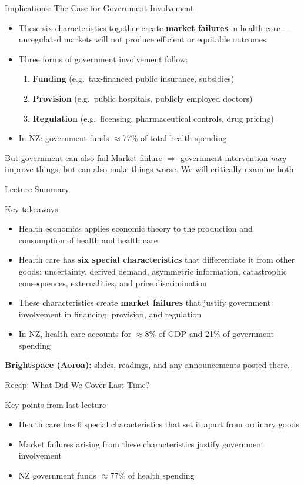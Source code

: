 \documentclass[aspectratio=169, 12pt]{beamer}
\newcommand{\recapslide}[1]{%
  \begin{frame}{Recap: What Did We Cover Last Time?}
    \begin{block}{Key points from last lecture}
      \begin{itemize}#1\end{itemize}
    \end{block}
  \end{frame}}
\newcommand{\summaryside}[1]{%
  \begin{frame}{Lecture Summary}
    \begin{exampleblock}{Key takeaways}
      \begin{itemize}#1\end{itemize}
    \end{exampleblock}
    \vspace{0.5em}
    {\footnotesize\textcolor{OtagoGold}{\textbf{Brightspace (Aoroa):}} slides, readings, and any announcements posted there.}
  \end{frame}}
\begin{document}
\begin{frame}{Implications: The Case for Government Involvement}
  \begin{itemize}
    \item These six characteristics together create \textbf{market failures} in health care ---
          unregulated markets will not produce efficient or equitable outcomes
    \item Three forms of government involvement follow:
    \begin{enumerate}
      \item \textbf{Funding} (e.g.\ tax-financed public insurance, subsidies)
      \item \textbf{Provision} (e.g.\ public hospitals, publicly employed doctors)
      \item \textbf{Regulation} (e.g.\ licensing, pharmaceutical controls, drug pricing)
    \end{enumerate}
    \item In NZ: government funds $\approx$77\% of total health spending
  \end{itemize}
  \vspace{0.3em}
  \begin{alertblock}{But government can also fail}
    Market failure $\Rightarrow$ government intervention \emph{may} improve things, but can also
    make things worse. We will critically examine both.
  \end{alertblock}
\end{frame}

\summaryside{
  \item Health economics applies economic theory to the production and consumption of health and health care
  \item Health care has \textbf{six special characteristics} that differentiate it from other goods: uncertainty, derived demand, asymmetric information, catastrophic consequences, externalities, and price discrimination
  \item These characteristics create \textbf{market failures} that justify government involvement in financing, provision, and regulation
  \item In NZ, health care accounts for $\approx$8\% of GDP and 21\% of government spending
}


\recapslide{
  \item Health care has 6 special characteristics that set it apart from ordinary goods
  \item Market failures arising from these characteristics justify government involvement
  \item NZ government funds $\approx$77\% of health spending
}
\end{document}
